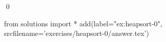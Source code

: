 
\begin{ex} 
  \label{ex:heapsort-0}
  
  \qed
\end{ex} 
\begin{python0}
from solutions import *
add(label="ex:heapsort-0",
    srcfilename='exercises/heapsort-0/answer.tex') 
\end{python0}

